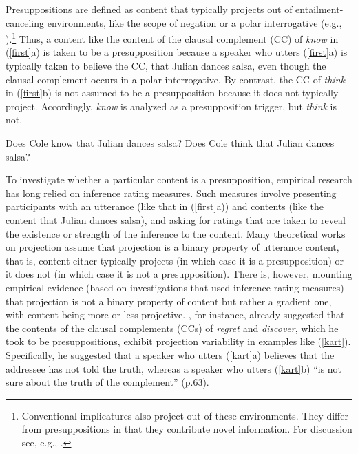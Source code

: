 \documentclass[11pt,fleqn]{article}
\newcommand{\6}{\mbox{$[\hspace*{-.6mm}[$}}
\newcommand{\9}{\mbox{$]\hspace*{-.6mm}]$}}
\begin{document}
Presuppositions are defined as content that typically projects out of entailment-canceling environments, like the scope of negation or a polar interrogative (e.g., \citealt{frege1892,ccmg90}).\footnote{Conventional implicatures also project out of these environments. They differ from presuppositions in that they contribute novel information. For discussion see, e.g., \citealt{ccmg90,potts05}.} Thus, a content like the content of the clausal complement (CC) of {\em know} in (\ref{first}a) is taken to be a presupposition because a speaker who utters (\ref{first}a) is typically taken to believe the CC, that Julian dances salsa, even though the clausal complement occurs in a polar interrogative. By contrast, the CC of {\em think} in (\ref{first}b) is not assumed to be a presupposition because it does not typically project. Accordingly, {\em know} is analyzed as a presupposition trigger, but {\em think} is not.

\begin{exe}
\ex\label{first} 
\begin{xlist}
\ex Does Cole know that Julian dances salsa?
\ex Does Cole think that Julian dances salsa?
\end{xlist}
\end{exe}

To investigate whether a particular content is a presupposition, empirical research has long relied on inference rating measures. Such measures involve presenting participants with an utterance (like that in (\ref{first}a)) and contents (like the content that Julian dances salsa), and asking for ratings that are taken to reveal the existence or strength of the inference to the content. Many theoretical works on projection assume that projection is a binary property of utterance content, that is, content either typically projects (in which case it is a presupposition) or it does not (in which case it is not a presupposition). There is, however, mounting empirical evidence (based on investigations that used inference rating measures) that projection is not a binary property of  content but rather a gradient one, with  content being more or less projective. \citealt{karttunen71b}, for instance, already suggested that the contents of the clausal complements (CCs) of {\em regret} and {\em discover}, which he took to be presuppositions, exhibit projection variability in examples like (\ref{kart}). Specifically, he suggested that a speaker who utters (\ref{kart}a) believes that the addressee has not told the truth, whereas a speaker who utters (\ref{kart}b) ``is not sure about the truth of the complement'' (p.63).
\end{document}

